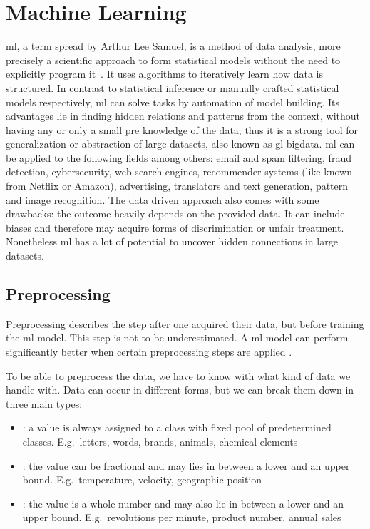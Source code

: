 

\section{Machine Learning}
\label{sec:machine-learning}

\gls{ml}, a term spread by Arthur Lee Samuel, is a method of data analysis, more precisely a scientific approach to form statistical models without the need to explicitly program it~\cite{mahesh2020machine}.
It uses algorithms to iteratively learn how data is structured.
In contrast to statistical inference or manually crafted statistical models respectively, \gls{ml} can solve tasks by automation of model building.
Its advantages lie in finding hidden relations and patterns from the context, without having any or only a small pre knowledge of the data, thus it is a strong tool for generalization or abstraction of large datasets, also known as \gls{gl-bigdata}.
\gls{ml} can be applied to the following fields among others: email and spam filtering, fraud detection, cybersecurity, web search engines, recommender systems (like known from Netflix or Amazon), advertising, translators and text generation, pattern and image recognition.
The data driven approach also comes with some drawbacks: the outcome heavily depends on the provided data.
It can include biases and therefore may acquire forms of discrimination or unfair treatment.
Nonetheless \gls{ml} has a lot of potential to uncover hidden connections in large datasets.

\subsection{Preprocessing}

Preprocessing describes the step after one acquired their data, but before training the \gls{ml} model.
This step is not to be underestimated.
A \gls{ml} model can perform significantly better when certain preprocessing steps are applied \cite{alam2019impact}.

To be able to preprocess the data, we have to know with what kind of data we handle with.
Data can occur in different forms, but we can break them down in three main types:
\begin{itemize}
    \item {}: a value is always assigned to a class with fixed pool of predetermined classes.
          E.g.\ letters, words, brands, animals, chemical elements
    \item {}: the value can be fractional and may lies in between a lower and an upper bound.
          E.g.\ temperature, velocity, geographic position
    \item {}: the value is a whole number and may also lie in between a lower and an upper bound.
          E.g.\ revolutions per minute, product number, annual sales
\end{itemize}

